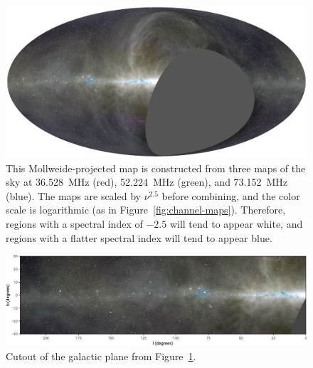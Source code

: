 \documentclass[twocolumn]{aastex61}
\begin{document}
\begin{figure}[t]
    \centering
    \includegraphics[width=\textwidth]{figures/three-color/ovro-lwa-sky-map.pdf}
    \caption{
        This Mollweide-projected map is constructed from three maps of the sky at 36.528~MHz (red),
        52.224~MHz (green), and 73.152~MHz (blue). The maps are scaled by $\nu^{2.5}$ before
        combining, and the color scale is logarithmic (as in Figure~\ref{fig:channel-maps}).
        Therefore, regions with a spectral index of $-2.5$ will tend to appear white, and regions
        with a flatter spectral index will tend to appear blue.
    }
    \label{fig:three-color}
\end{figure}

\begin{figure}[t]
    \centering
    \includegraphics[width=\textwidth]{figures/three-color/ovro-lwa-galactic-plane.pdf}
    \caption{
        Cutout of the galactic plane from Figure~\ref{fig:three-color}.
    }
    \label{fig:galactic-plane-cutout}
\end{figure}
\end{document}
